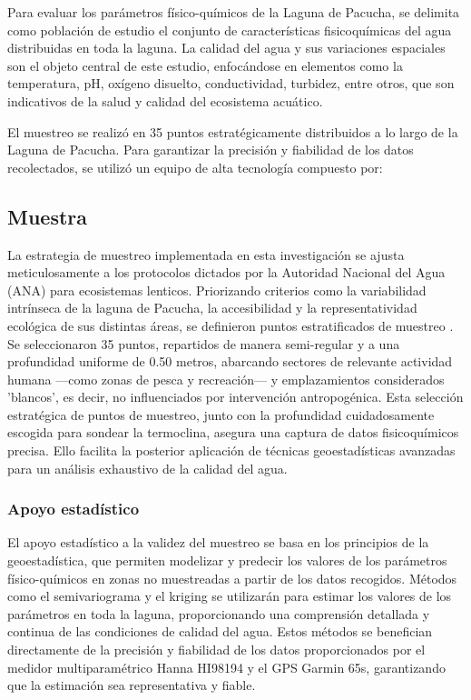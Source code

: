  

 Para evaluar los parámetros físico-químicos de la Laguna de Pacucha, se delimita como población de estudio el conjunto de características fisicoquímicas del agua distribuidas en toda la laguna. La calidad del agua y sus variaciones espaciales son el objeto central de este estudio, enfocándose en elementos como la temperatura, pH, oxígeno disuelto, conductividad, turbidez, entre otros, que son indicativos de la salud y calidad del ecosistema acuático.

El muestreo se realizó en 35 puntos estratégicamente distribuidos a lo largo de la Laguna de Pacucha. Para garantizar la precisión y fiabilidad de los datos recolectados, se utilizó un equipo de alta tecnología compuesto por:




\subsection{Muestra}
 La estrategia de muestreo implementada en esta investigación se ajusta meticulosamente a los protocolos dictados por la Autoridad Nacional del Agua (ANA) para ecosistemas lenticos. Priorizando criterios como la variabilidad intrínseca de la laguna de Pacucha, la accesibilidad y la representatividad ecológica de sus distintas áreas, se definieron puntos estratificados de muestreo \cite{ana_protocolo_2023}. Se seleccionaron 35 puntos, repartidos de manera semi-regular y a una profundidad uniforme de 0.50 metros, abarcando sectores de relevante actividad humana —como zonas de pesca y recreación— y emplazamientos considerados 'blancos', es decir, no influenciados por intervención antropogénica. Esta selección estratégica de puntos de muestreo, junto con la profundidad cuidadosamente escogida para sondear la termoclina, asegura una captura de datos fisicoquímicos precisa. Ello facilita la posterior aplicación de técnicas geoestadísticas avanzadas para un análisis exhaustivo de la calidad del agua.

\subsubsection*{ Apoyo estadístico}
El apoyo estadístico a la validez del muestreo se basa en los principios de la geoestadística, que permiten modelizar y predecir los valores de los parámetros físico-químicos en zonas no muestreadas a partir de los datos recogidos. Métodos como el semivariograma y el kriging se utilizarán para estimar los valores de los parámetros en toda la laguna, proporcionando una comprensión detallada y continua de las condiciones de calidad del agua. Estos métodos se benefician directamente de la precisión y fiabilidad de los datos proporcionados por el medidor multiparamétrico Hanna HI98194 y el GPS Garmin 65s, garantizando que la estimación sea representativa y fiable.

